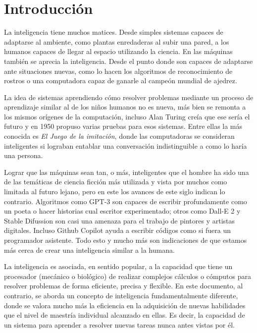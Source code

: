 \chapter*{Introducción}\label{chapter:introduction}
La inteligencia tiene muchos matices. Desde simples sistemas capaces de adaptarse al ambiente, como plantas enredaderas al subir una pared, a los humanos capaces de llegar al espacio utilizando la ciencia. En las máquinas también se aprecia la inteligencia. Desde el punto donde son capaces de adaptarse ante situaciones nuevas, como lo hacen los algoritmos de reconocimiento de rostros o una computadora capaz de ganarle al campeón mundial de ajedrez. 

La idea de sistemas aprendiendo cómo resolver problemas mediante un proceso de aprendizaje similar al de los niños humanos no es nueva, más bien se remonta a los mismos orígenes de la computación, incluso Alan Turing creía que ese sería el futuro y en 1950 propuso varias pruebas para esos sistemas. Entre ellas la más conocida es \textit{El Juego de la imitación}, donde las computadoras se consideran inteligentes si lograban entablar una conversación indistinguible a como lo haría una persona. 

Lograr que las máquinas sean tan, o más, inteligentes que el hombre ha sido una de las temáticas de ciencia ficción más utilizada y vista por muchos como limitada al futuro lejano, pero en este los avances de este siglo indican lo contrario. Algoritmos como GPT-3 son capaces de escribir profundamente como un poeta o hacer historias cual escritor experimentado; otros como Dall-E 2 y Stable Difussion son casi una amenaza para el trabajo de pintores y artistas digitales. Incluso Github Copilot ayuda a escribir códigos como si fuera un programador asistente. Todo esto y mucho más son indicaciones de que estamos más cerca de crear una inteligencia similar a la humana.

La inteligencia es asociada, en sentido popular, a la capacidad que tiene un procesador (mecánico o biológico) de realizar complejos cálculos o cómputos para resolver problemas de forma eficiente, precisa y flexible. En este documento, al contrario, se aborda un concepto de inteligencia fundamentalmente diferente, donde se valora mucho más la eficiencia en la adquisición de nuevas habilidades que el nivel de maestría individual alcanzado en ellas. Es decir, la capacidad de un sistema para aprender a resolver nuevas tareas nunca antes vistas por él.

